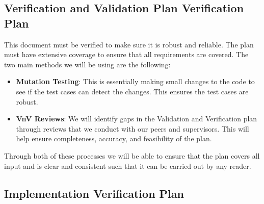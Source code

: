 \documentclass[12pt, titlepage]{article}
\begin{document}



\subsection{Verification and Validation Plan Verification Plan}




This document must be verified to make sure it is robust and reliable. The plan must have extensive coverage to ensure that all requirements are covered. The two main methods we will be using are the following:

\begin{itemize}
  \item \textbf{Mutation Testing}: This is essentially making small changes to the code to see if the test cases can detect the changes. This ensures the test cases are robust.
  
  \item \textbf{VnV Reviews}: We will identify gaps in the Validation and Verification plan through reviews that we conduct with our peers and supervisors. This will help ensure completeness, accuracy, and feasibility of the plan.
\end{itemize}

Through both of these processes we will be able to ensure that the plan covers all input and is clear and consistent such that it can be carried out by any reader.

\subsection{Implementation Verification Plan}


\end{document}
